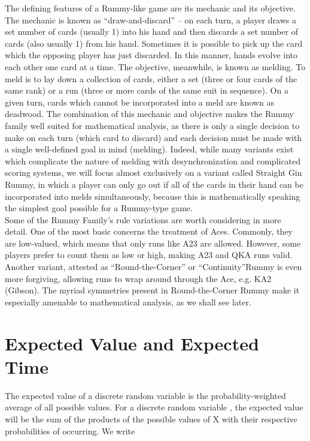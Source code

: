 \documentclass[paper=a4, fontsize=11pt,twoside]{report}   %
\begin{document}
The defining features of a Rummy-like game are its mechanic and its objective. The mechanic is known as “draw-and-discard” – on each turn, a player draws a set number of cards (usually 1) into his hand and then discards a set number of cards (also usually 1) from his hand. Sometimes it is possible to pick up the card which the opposing player has just discarded. In this manner, hands evolve into each other one card at a time. The objective, meanwhile, is known as melding. To meld is to lay down a collection of cards, either a set (three or four cards of the same rank) or a run (three or more cards of the same suit in sequence). On a given turn, cards which cannot be incorporated into a meld are known as deadwood. The combination of this mechanic and objective makes the Rummy family well suited for mathematical analysis, as there is only a single decision to make on each turn (which card to discard) and each decision must be made with a single well-defined goal in mind (melding). Indeed, while many variants exist which complicate the nature of melding with desynchronization and complicated scoring systems, we will focus almost exclusively on a variant called Straight Gin Rummy, in which a player can only go out if all of the cards in their hand can be incorporated into melds simultaneously, because this is mathematically speaking the simplest goal possible for a Rummy-type game.\\

Some of the Rummy Family’s rule variations are worth considering in more detail. One of the most basic concerns the treatment of Aces. Commonly, they are low-valued, which means that only runs like A23 are allowed. However, some players prefer to count them as low or high, making A23 and QKA runs valid. Another variant, attested as “Round-the-Corner” or “Continuity”Rummy is even more forgiving, allowing runs to wrap around through the Ace, e.g. KA2 (Gibson). The myriad symmetries present in Round-the-Corner Rummy make it especially amenable to mathematical analysis, as we shall see later. \\
 
\section{Expected Value and Expected Time}

The expected value of a discrete random variable is the probability-weighted average of all possible values. For a discrete random variable , the expected value will be the sum of the products of the possible values of X with their respective probabilities of occurring. We write\\
\end{document}

